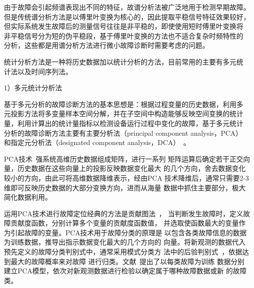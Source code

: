 由于故障会引起频谱表现出不同的特征，故谱分析法被广泛地用于检测早期故障。
但是传统谱分析方法是以傅里叶变换为核心的，因此提取平稳信号特征效果较好，
但实际系统发生故障后的测量信号往往是非平稳的，即使使用短时傅里叶变换将
非平稳信号分为短的伪平稳段，基于傅里叶变换的方法也不适合复杂时频特性的
分析，这些都是用谱分析方法进行微小故障诊断时需要考虑的问题。

统计分析方法是一种将历史数据加以统计分析的方法，目前常用的主要有多元统
计法以及时间序列法。

1）多元统计分析法

基于多元分析的故障诊断方法的基本思想是：根据过程变量的历史数据，利用多
元投影方法将多变量样本空间分解，并在子空间中构造能够反映空间变换的统计
量，利用计算出的统计量指标以检测设备运行过程中变化的故障，基于多元统计
分析的故障诊断方法主要有主要分析法（principal component analysis，PCA）~\cite{zhao2008line}
和指定元分析法（designated component analysis，DCA）~\cite{zhou2008dca}。

PCA技术~\cite{abdi2010principal}强系统高维历史数据组成矩阵，进行一系列
矩阵运算后确定若干正交向量，历史数据在这些向量上的投影反映数据变化最大
的几个方向，舍去数据变化较小的方向，由此可将高维数据降维表示，经由PCA
技术降维后，通常只需要2-3维即可反映历史数据的大部分变换方向，进而从海量
数据中抓住主要部分，极大简化数据利用。

运用PCA技术进行故障定位经典的方法是贡献图法~\cite{miller1998contribution}，
当判断发生故障时，定义故障贡献度函数，分别计算多个变量的贡献度函数值，
并选取使函数最大的变量作为引起故障的变量。PCA技术用于故障分类的原理是
以包含各类故障信息的数据为训练数据，推导出指示数据变化最大的几个方向的
向量。将新观测的数据代入预先定义的故障分类判别式中，通常采用模式分类方
法中的后验判别式~\cite{duda2000pattern}，依据达到最大的故障概率来对故障
进行归类。文献~提出了以每类故障为训练
数据分别建立PCA模型，依次对新观测数据进行检验以确定属于哪种故障数据或新
的故障类。

